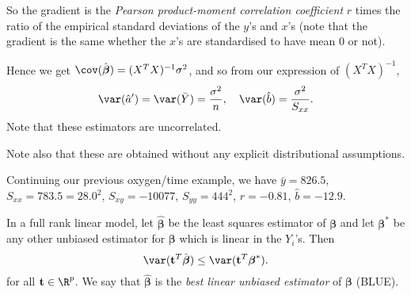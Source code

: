 \documentclass[a4paper]{article}
\begin{document}
So the gradient is the \emph{Pearson product-moment correlation coefficient} $r$ times the ratio of the empirical standard deviations of the $y$'s and $x$'s (note that the gradient is the same whether the $x$'s are standardised to have mean 0 or not).

Hence we get $\cov(\hat{\boldsymbol\beta}) = (X^TX)^{-1}\sigma^2$, and so from our expression of $(X^TX)^{-1}$,
\[
  \var(\hat{a}') = \var (\bar Y) = \frac{\sigma^2}{n}, \quad\var(\hat{b}) = \frac{\sigma^2}{S_{xx}}.
\]
Note that these estimators are uncorrelated.

Note also that these are obtained without any explicit distributional assumptions.

\begin{eg}
  Continuing our previous oxygen/time example, we have $\bar y = 826.5$, $S_{xx} = 783.5 = 28.0^2$, $S_{xy} = -10077$, $S_{yy} = 444^2$, $r = -0.81$, $\hat b = -12.9$.
\end{eg}

\begin{thm}
  In a full rank linear model, let $\hat{\boldsymbol\beta}$ be the least squares estimator of $\boldsymbol\beta$ and let $\boldsymbol\beta^*$ be any other unbiased estimator for $\boldsymbol\beta$ which is linear in the $Y_i$'s. Then
  \[
    \var(\mathbf{t}^T\hat{\boldsymbol\beta}) \leq \var (\mathbf{t}^T\boldsymbol\beta^*).
  \]
  for all $\mathbf{t}\in \R^p$. We say that $\hat{\boldsymbol\beta}$ is the \emph{best linear unbiased estimator} of $\boldsymbol\beta$ (BLUE).
\end{thm}
\end{document}
